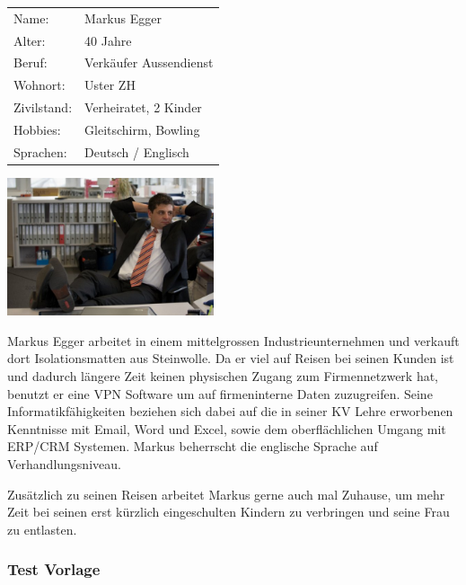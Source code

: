\noindent\begin{minipage}[t]{0.5\textwidth}
\vspace{0pt}
    \begin{tabular}{ l l }
        Name: & Markus Egger \\
        Alter: & 40 Jahre \\
        Beruf: & Verkäufer Aussendienst \\
        Wohnort: & Uster ZH \\
        Zivilstand: & Verheiratet, 2 Kinder \\
        Hobbies: & Gleitschirm, Bowling \\
        Sprachen: & Deutsch / Englisch \\
    \end{tabular}
\end{minipage}
\hfill
\begin{minipage}[t]{0.5\textwidth}
\vspace{0pt}
    \includegraphics[width=230px]{images/persona_user.jpg}\\
\end{minipage}


Markus Egger arbeitet in einem mittelgrossen Industrieunternehmen und verkauft dort Isolationsmatten aus Steinwolle. Da er viel auf Reisen bei seinen Kunden ist und dadurch längere Zeit keinen physischen Zugang zum Firmennetzwerk hat, benutzt er eine VPN Software um auf firmeninterne Daten zuzugreifen. Seine Informatikfähigkeiten beziehen sich dabei auf die in seiner KV Lehre erworbenen Kenntnisse mit Email, Word und Excel, sowie dem oberflächlichen Umgang mit ERP/CRM Systemen.
Markus beherrscht die englische Sprache auf Verhandlungsniveau.

Zusätzlich zu seinen Reisen arbeitet Markus gerne auch mal Zuhause, um mehr Zeit bei seinen erst kürzlich eingeschulten Kindern zu verbringen und seine Frau zu entlasten.

\subsubsection{Test Vorlage}


